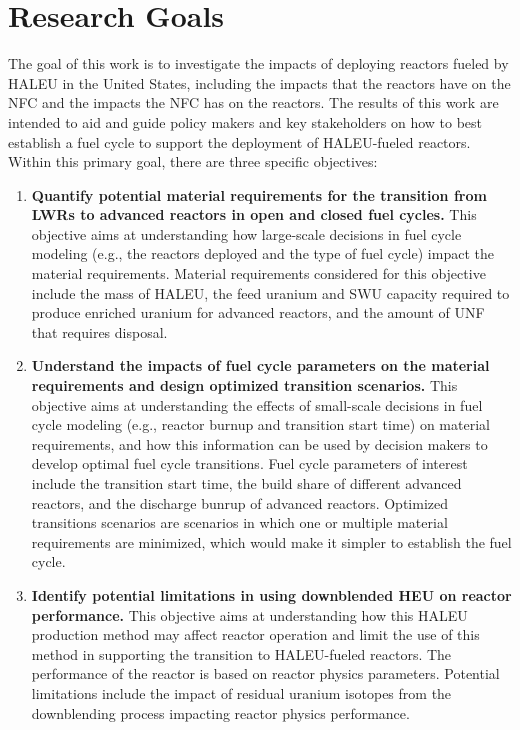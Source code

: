 \section{Research Goals}
The goal of this work is to investigate the impacts of deploying reactors 
fueled 
by \gls{HALEU} in the United States, including the impacts that the reactors 
have on the \gls{NFC} and the impacts the \gls{NFC} has on the reactors. 
The results of this work are intended to
aid and guide policy makers and key stakeholders on how to best establish a 
fuel cycle to support the deployment of \gls{HALEU}-fueled reactors. 
Within this primary goal, there are three specific objectives:
\vspace{0.2cm} 
\noindent
\begin{enumerate}
\item \textbf{Quantify potential material requirements for the transition 
from \glspl{LWR} to advanced reactors in open and closed 
fuel cycles.} This objective aims 
at understanding how large-scale decisions in fuel cycle 
modeling (e.g., the reactors deployed and the type of fuel cycle)
impact the material requirements. 
Material requirements considered for this objective include  
the mass of \gls{HALEU}, the feed uranium and \gls{SWU} capacity 
required to produce enriched uranium for advanced reactors, and 
the amount of \gls{UNF} that requires disposal. 

\item \textbf{Understand the impacts of fuel cycle parameters on the material 
requirements and design optimized transition scenarios.} 
This objective 
aims at understanding the effects of small-scale decisions in 
fuel cycle modeling (e.g., reactor burnup and transition start time)
on material requirements, and how this information can be used by 
decision makers to develop optimal fuel cycle transitions. Fuel cycle 
parameters of interest include the transition start time, the 
build share of different advanced reactors, and the discharge 
bunrup of advanced reactors. Optimized transitions scenarios are 
scenarios in which one or multiple material requirements are minimized, 
which would make it simpler to establish the fuel cycle. 

\item \textbf{Identify potential limitations in using downblended \gls{HEU} 
on reactor performance.}  This objective aims at understanding 
how this \gls{HALEU} production method may affect reactor operation 
and limit the use of this method in supporting the transition to 
\gls{HALEU}-fueled reactors. The performance of the reactor is based on 
reactor physics parameters. Potential limitations include 
the impact of residual uranium isotopes from the downblending 
process impacting reactor physics performance. 


\end{enumerate}
